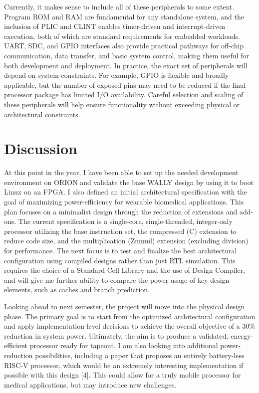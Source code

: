\documentclass[conference]{IEEEtran}
\begin{document}
Currently, it makes sense to include all of these peripherals to some extent. Program ROM and RAM are fundamental for any standalone system, and the inclusion of PLIC and CLINT enables timer-driven and interrupt-driven execution, both of which are standard requirements for embedded workloads. UART, SDC, and GPIO interfaces also provide practical pathways for off-chip communication, data transfer, and basic system control, making them useful for both development and deployment. In practice, the exact set of peripherals will depend on system constraints. For example, GPIO is flexible and broadly applicable, but the number of exposed pins may need to be reduced if the final processor package has limited I/O availability. Careful selection and scaling of these peripherals will help ensure functionality without exceeding physical or architectural constraints.

\section{Discussion}
At this point in the year, I have been able to set up the needed development environment on ORION and validate the base WALLY design by using it to boot Linux on an FPGA. I also defined an initial architectural specification with the goal of maximizing power-efficiency for wearable biomedical applications. This plan focuses on a minimalist design through the reduction of extensions and add-ons. The current specification is a single-core, single-threaded, integer-only processor utilizing the base instruction set, the compressed (C) extension to reduce code size, and the multiplication (Zmmul) extension (excluding division) for performance. The next focus is to test and finalize the best architectural configuration using compiled designs rather than just RTL simulation. This requires the choice of a Standard Cell Library and the use of Design Compiler, and will give me further ability to compare the power usage of key design elements, such as caches and branch prediction.

Looking ahead to next semester, the project will move into the physical design phase. The primary goal is to start from the optimized architectural configuration and apply implementation-level decisions to achieve the overall objective of a 30\% reduction in system power. Ultimately, the aim is to produce a validated, energy-efficient processor ready for tapeout. I am also looking into additional power-reduction possibilities, including a paper that proposes an entirely battery-less RISC-V processor, which would be an extremely interesting implementation if possible with this design [4]. This could allow for a truly mobile processor for medical applications, but may introduce new challenges.
\end{document}
